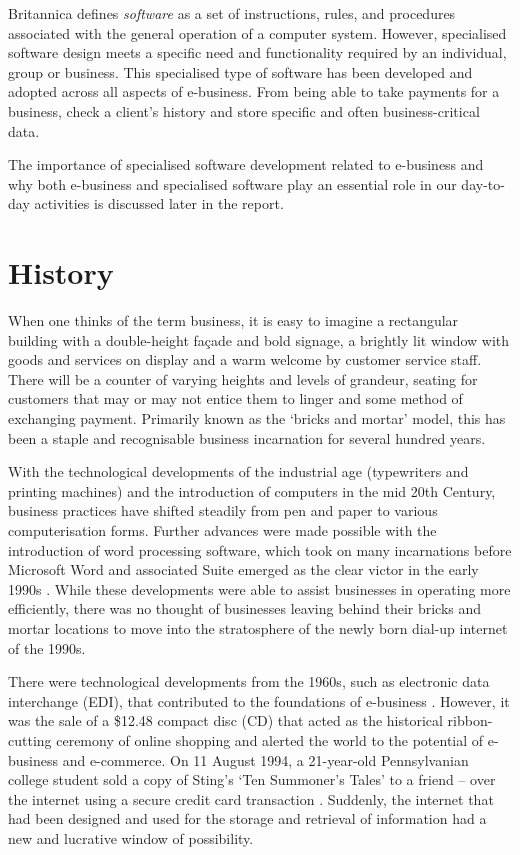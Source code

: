 \documentclass[12pt]{article}
\begin{document}
Britannica \cite{britannica} defines \emph{software} as a set of instructions, rules, and procedures associated with the general operation of a computer system. However, specialised software design meets a specific need and functionality required by an individual, group or business. This specialised type of software has been developed and adopted across all aspects of e-business. From being able to take payments for a business, check a client’s history and store specific and often business-critical data. 

The importance of specialised software development related to e-business and why both e-business and specialised software play an essential role in our day-to-day activities is discussed later in the report.

\section{History}
When one thinks of the term business, it is easy to imagine a rectangular building with a double-height façade and bold signage, a brightly lit window with goods and services on display and a warm welcome by customer service staff. There will be a counter of varying heights and levels of grandeur, seating for customers that may or may not entice them to linger and some method of exchanging payment. Primarily known as the ‘bricks and mortar’ model, this has been a staple and recognisable business incarnation for several hundred years. \par 

With the technological developments of the industrial age (typewriters and printing machines) and the introduction of computers in the mid 20th Century, business practices have shifted steadily from pen and paper to various computerisation forms. Further advances were made possible with the introduction of word processing software, which took on many incarnations before Microsoft Word and associated Suite emerged as the clear victor in the early 1990s \cite{redmond}. While these developments were able to assist businesses in operating more efficiently, there was no thought of businesses leaving behind their bricks and mortar locations to move into the stratosphere of the newly born dial-up internet of the 1990s. \par 

There were technological developments from the 1960s, such as electronic data interchange (EDI), that contributed to the foundations of e-business \cite{miva}. However, it was the sale of a \$12.48 compact disc (CD) that acted as the historical ribbon-cutting ceremony of online shopping and alerted the world to the potential of e-business and e-commerce. On 11 August 1994, a 21-year-old Pennsylvanian college student sold a copy of Sting’s ‘Ten Summoner’s Tales’ to a friend – over the internet using a secure credit card transaction \cite{arcand}. Suddenly, the internet that had been designed and used for the storage and retrieval of information had a new and lucrative window of possibility. \par 
\end{document}

